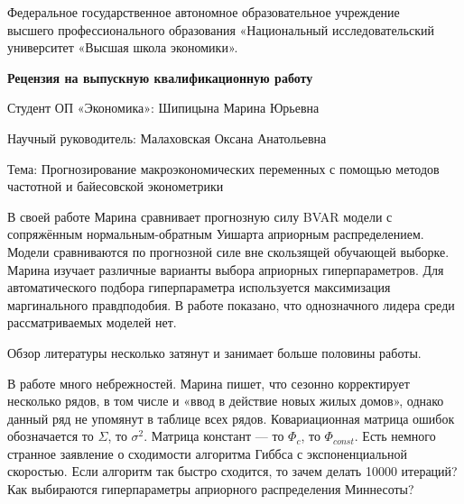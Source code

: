 \documentclass[a4paper, 12pt]{article}
\begin{document}
\begin{center}
{\small Федеральное государственное автономное образовательное учреждение\\ 
высшего профессионального образования «Национальный исследовательский\\ 
университет «Высшая школа экономики».}
\end{center}

\vspace{0.4cm}

\begin{center}
\textbf{Рецензия на выпускную квалификационную работу}
\end{center}

\vspace{0.4cm}

Студент ОП «Экономика»: Шипицына Марина Юрьевна

\vspace{0.4cm}

Научный руководитель: Малаховская Оксана Анатольевна

\vspace{0.4cm}

Тема: Прогнозирование макроэкономических переменных с помощью методов
частотной и байесовской эконометрики

\vspace{0.4cm}

В своей работе Марина сравнивает прогнозную силу BVAR модели с
сопряжённым нормальным-обратным Уишарта априорным распределением. Модели
сравниваются по прогнозной силе вне скользящей обучающей выборке. Марина
изучает различные варианты выбора априорных гиперпараметров. Для
автоматического подбора гиперпараметра используется максимизация
маргинального правдподобия. В работе показано, что однозначного лидера
среди рассматриваемых моделей нет.

Обзор литературы несколько затянут и занимает больше половины работы.

В работе много небрежностей. Марина пишет, что сезонно корректирует
несколько рядов, в том числе и «ввод в действие новых жилых домов»,
однако данный ряд не упомянут в таблице всех рядов. Ковариационная
матрица ошибок обозначается то \(\Sigma\), то \(\sigma^2\). Матрица
констант --- то \(\Phi_c\), то \(\Phi_{const}\). Есть немного странное
заявление о сходимости алгоритма Гиббса с экспоненциальной скоростью.
Если алгоритм так быстро сходится, то зачем делать 10000 итераций? Как
выбираются гиперпараметры априорного распределения Миннесоты?
\end{document}
